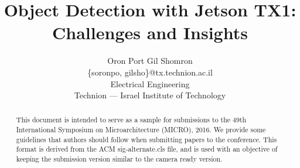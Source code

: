 \documentclass{sig-alternate}
\title{Object Detection with Jetson TX1:\\Challenges and Insights}
\author{
  {
  Oron Port\hspace{10 mm}
  Gil Shomron}\\[0mm]
  \{soronpo, gilsho\}@tx.technion.ac.il\\[0mm]
  Electrical Engineering\\[0mm]
  Technion --- Israel Institute of Technology
}
\begin{document}
\maketitle
\thispagestyle{firstpage}
\pagestyle{plain}




\begin{abstract}

  This document is intended to serve as a sample for submissions to
  the 49th International Symposium on Microarchitecture (MICRO), 2016.
  We provide some guidelines that authors should follow when
  submitting papers to the conference.  This format is derived from
  the ACM sig-alternate.cls file, and is used with an objective of
  keeping the submission version similar to the camera ready version. 

\end{abstract}













\end{document}
